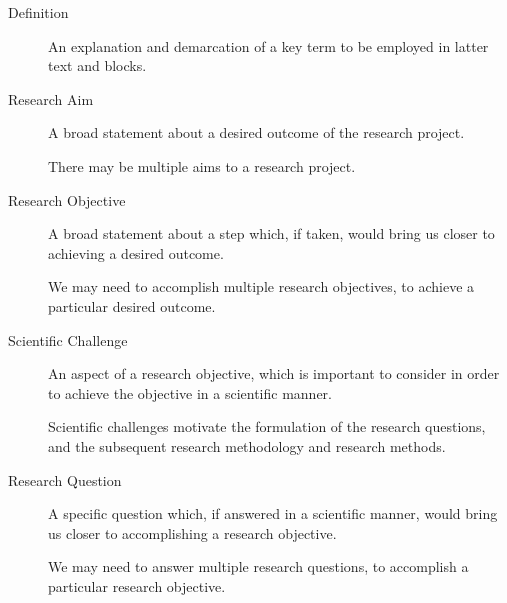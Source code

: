 \begin{description}

\item[Definition] \hfill

An explanation and demarcation of a key term to be employed in latter
text and blocks.

\item[Research Aim] \hfill

A broad statement about a desired outcome of the research project.

There may be multiple aims to a research project.

\item[Research Objective] \hfill

A broad statement about a step which, if taken, would bring us closer
to achieving a desired outcome.

We may need to accomplish multiple research objectives, to achieve a
particular desired outcome.

\item[Scientific Challenge] \hfill

An aspect of a research objective, which is important to consider in
order to achieve the objective in a scientific manner.

Scientific challenges motivate the formulation of the research
questions, and the subsequent research methodology and research
methods.

\item[Research Question] \hfill

A specific question which, if answered in a scientific manner, would
bring us closer to accomplishing a research objective.

We may need to answer multiple research questions, to accomplish a
particular research objective.

\end{description}
